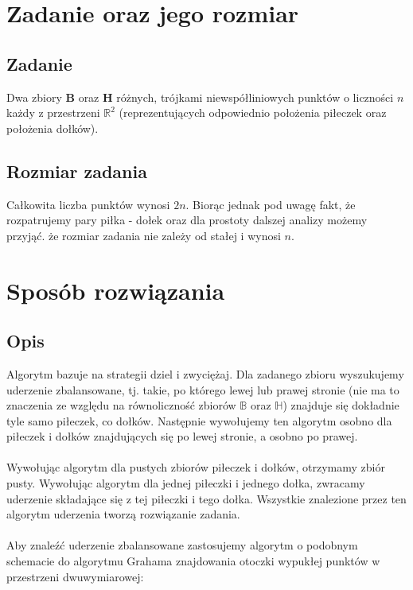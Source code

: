 \documentclass[10pt,a4paper]{article}
\begin{document}
	\section{Zadanie oraz jego rozmiar}
	
	\subsection{Zadanie}
	Dwa zbiory $\mathbf{B}$ oraz $\mathbf{H}$ różnych, trójkami niewspółliniowych punktów o liczności $n$ każdy z przestrzeni $\mathbb{R}^{2}$ (reprezentujących odpowiednio położenia piłeczek oraz położenia dołków).
	
	\subsection{Rozmiar zadania}
	
	Całkowita liczba punktów wynosi $2n$. Biorąc jednak pod uwagę fakt, że rozpatrujemy pary piłka - dołek oraz dla prostoty dalszej analizy możemy przyjąć. że rozmiar zadania nie zależy od stałej i wynosi $n$.
	
	\section{Sposób rozwiązania}
	
	\subsection{Opis}
	
	Algorytm bazuje na strategii dziel i zwyciężaj. Dla zadanego zbioru wyszukujemy uderzenie zbalansowane, tj. takie, po którego lewej lub prawej stronie (nie ma to znaczenia ze względu na równoliczność zbiorów $\mathbb{B}$ oraz $\mathbb{H}$) znajduje się dokładnie tyle samo piłeczek, co dołków. Następnie wywołujemy ten algorytm osobno dla piłeczek i dołków znajdujących się po lewej stronie, a osobno po prawej. \\~\\
	Wywołując algorytm dla pustych zbiorów piłeczek i dołków, otrzymamy zbiór pusty. Wywołując algorytm dla jednej piłeczki i jednego dołka, zwracamy uderzenie składające się z tej piłeczki i tego dołka. Wszystkie znalezione przez ten algorytm uderzenia tworzą rozwiązanie zadania. \\~\\
	Aby znaleźć uderzenie zbalansowane zastosujemy algorytm o podobnym schemacie do algorytmu Grahama znajdowania otoczki wypukłej punktów w przestrzeni dwuwymiarowej:
	
\end{document}
